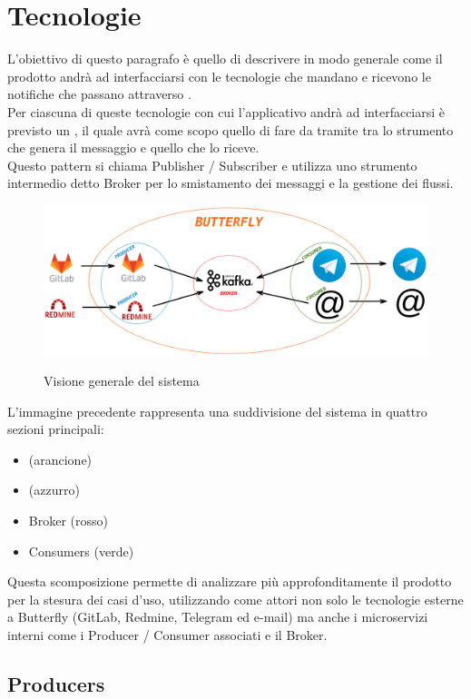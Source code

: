 \section{Tecnologie}
	L'obiettivo di questo paragrafo è quello di descrivere in modo generale come il prodotto andrà ad interfacciarsi con le tecnologie che mandano e ricevono le notifiche che passano attraverso \progetto.\\
	Per ciascuna di queste tecnologie con cui l'applicativo andrà ad interfacciarsi è previsto un , il quale avrà come scopo quello di fare da tramite tra lo strumento che genera il messaggio e quello che lo riceve.\\
	Questo pattern si chiama Publisher / Subscriber e utilizza uno strumento intermedio detto Broker per lo smistamento dei messaggi e la gestione dei flussi.

	\begin{figure}[H]
		\centering
		\includegraphics[width=\textwidth]{img/butterfly.png}\\
		\caption{Visione generale del sistema \progetto}
		\label{fig:butterfly}
	\end{figure}
	L'immagine precedente rappresenta una suddivisione del sistema in quattro sezioni principali:
	\begin{itemize}
		\item \progetto (arancione)
		\item {} (azzurro)
		\item Broker (rosso)
		\item Consumers (verde)
	\end{itemize}
	Questa scomposizione permette di analizzare più approfonditamente il prodotto per la stesura dei casi d'uso, utilizzando come attori non solo le tecnologie esterne a Butterfly (GitLab, Redmine, Telegram ed e-mail) ma anche i microservizi interni come i Producer / Consumer associati e il Broker.
	
	\subsection{Producers}
	
